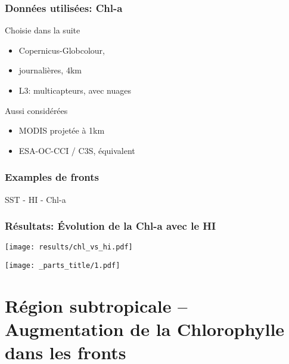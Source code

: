 \begin{frame}
  \frametitle{Données utilisées: Chl-a}

  \begin{block}{Choisie dans la suite}
    \begin{itemize}
      \item Copernicus-Globcolour,
      \item journalières, 4km
      \item L3: multicapteurs, avec nuages
    \end{itemize}
  \end{block}

  \begin{block}{Aussi considérées}
    \begin{itemize}
      \item MODIS projetée à 1km
      \item ESA-OC-CCI / C3S, équivalent
    \end{itemize}
  \end{block}

\end{frame}


\begin{frame}
  \frametitle{Examples de fronts}

  SST - HI - Chl-a
\end{frame}


\begin{frame}
  \frametitle{Résultats: Évolution de la Chl-a avec le HI}
  \texttt{[image: results/chl\_vs\_hi.pdf]}
\end{frame}


\begin{frame}
  \texttt{[image: \_parts\_title/1.pdf]}
\end{frame}


\section{Région subtropicale -- Augmentation de la Chlorophylle dans les fronts}

